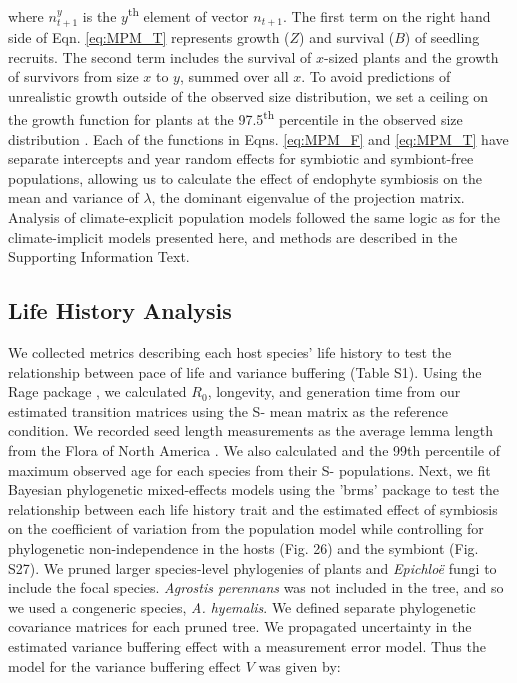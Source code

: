 \documentclass[9pt,twocolumn,twoside]{pnas-new}
\begin{document}
{where $n^y_{t+1}$ is the $y$\textsuperscript{th} element of vector \textbf{$n_{t+1}$}.
The first term on the right hand side of Eqn. \ref{eq:MPM_T} represents growth ($Z$) and survival ($B$) of seedling recruits. 
The second term includes the survival of $x$-sized plants and the growth of survivors from size $x$ to $y$, summed over all $x$. 
To avoid predictions of unrealistic growth outside of the observed size distribution, we set a ceiling on the growth function for plants at the 97.5\textsuperscript{th} percentile in the observed size distribution \cite{williams2012avoiding}.
Each of the functions in Eqns. \ref{eq:MPM_F} and \ref{eq:MPM_T} have separate intercepts and year random effects for symbiotic and symbiont-free populations, allowing us to calculate the effect of endophyte symbiosis on the mean and variance of $\lambda$, the dominant eigenvalue of the projection matrix. 
Analysis of climate-explicit population models followed the same logic as for the climate-implicit models presented here, and methods are described in the Supporting Information Text.

\subsection*{Life History Analysis}

We collected metrics describing each host species' life history to test the relationship between pace of life and variance buffering (Table S1). 
Using the Rage package \cite{jones2022rcompadre}, we calculated $R_0$, longevity, and generation time from our estimated transition matrices using the S- mean matrix as the reference condition.
We recorded seed length measurements as the average lemma length from the Flora of North America \cite{FloraNAonline}. 
We also calculated and the 99th percentile of maximum observed age for each species from their S- populations.
Next, we fit Bayesian phylogenetic mixed-effects models using the 'brms' package \cite{Burkner2017brms} to test the relationship between each life history trait and the estimated effect of symbiosis on the coefficient of variation from the population model while controlling for phylogenetic non-independence in the hosts (Fig. 26) and the symbiont (Fig. S27).
We pruned larger species-level phylogenies of plants\cite{zanne2014three} and \emph{Epichlo\"{e}} fungi \cite{leuchtmann2014nomenclatural} to include the focal species.
\emph{Agrostis perennans} was not included in the tree, and so we used a congeneric species, \emph{A. hyemalis}. 
We defined separate phylogenetic covariance matrices for each pruned tree.
We propagated uncertainty in the estimated variance buffering effect with a measurement error model.
Thus the model for the variance buffering effect $V$ was given by:

}
\end{document}
